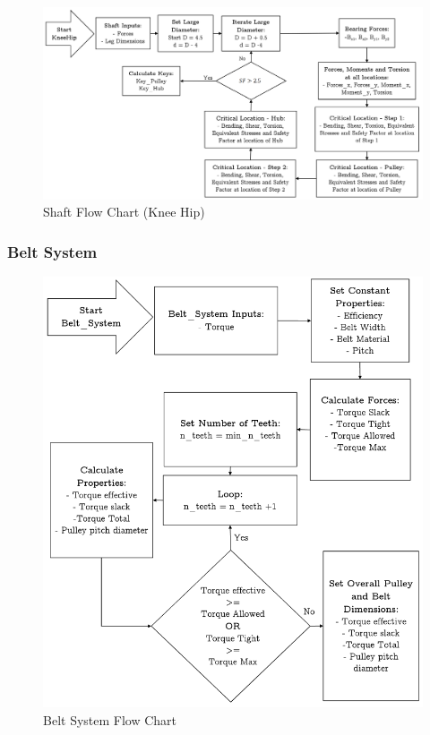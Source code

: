 \begin{figure}[H]
    \centering
    \includegraphics[width=\textwidth]{6_Appendices/Flowcharts/ShaftFlowChart_KneeHip.png}
    \caption{Shaft Flow Chart (Knee Hip)}
    \label{fig:shaft_flowchart(KneeHip)}
\end{figure}{}


\subsubsection{Belt System} \label{app_subsec:belt_flowchart}

\begin{figure}[H]
    \centering
    \includegraphics[width=\textwidth]{6_Appendices/Flowcharts/BeltFlowChart.png}
    \caption{Belt System Flow Chart}
    \label{fig:belt_flowchart}
\end{figure}{}


